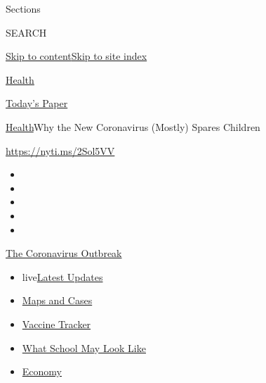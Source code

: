 Sections

SEARCH

\protect\hyperlink{site-content}{Skip to
content}\protect\hyperlink{site-index}{Skip to site index}

\href{https://www.nytimes.com/section/health}{Health}

\href{https://myaccount.nytimes.com/auth/login?response_type=cookie\&client_id=vi}{}

\href{https://www.nytimes.com/section/todayspaper}{Today's Paper}

\href{/section/health}{Health}\textbar{}Why the New Coronavirus (Mostly)
Spares Children

\url{https://nyti.ms/2Sol5VV}

\begin{itemize}
\item
\item
\item
\item
\item
\end{itemize}

\href{https://www.nytimes.com/news-event/coronavirus?action=click\&pgtype=Article\&state=default\&region=TOP_BANNER\&context=storylines_menu}{The
Coronavirus Outbreak}

\begin{itemize}
\tightlist
\item
  live\href{https://www.nytimes.com/2020/08/02/world/coronavirus-updates.html?action=click\&pgtype=Article\&state=default\&region=TOP_BANNER\&context=storylines_menu}{Latest
  Updates}
\item
  \href{https://www.nytimes.com/interactive/2020/us/coronavirus-us-cases.html?action=click\&pgtype=Article\&state=default\&region=TOP_BANNER\&context=storylines_menu}{Maps
  and Cases}
\item
  \href{https://www.nytimes.com/interactive/2020/science/coronavirus-vaccine-tracker.html?action=click\&pgtype=Article\&state=default\&region=TOP_BANNER\&context=storylines_menu}{Vaccine
  Tracker}
\item
  \href{https://www.nytimes.com/interactive/2020/07/29/us/schools-reopening-coronavirus.html?action=click\&pgtype=Article\&state=default\&region=TOP_BANNER\&context=storylines_menu}{What
  School May Look Like}
\item
  \href{https://www.nytimes.com/live/2020/07/31/business/stock-market-today-coronavirus?action=click\&pgtype=Article\&state=default\&region=TOP_BANNER\&context=storylines_menu}{Economy}
\end{itemize}

